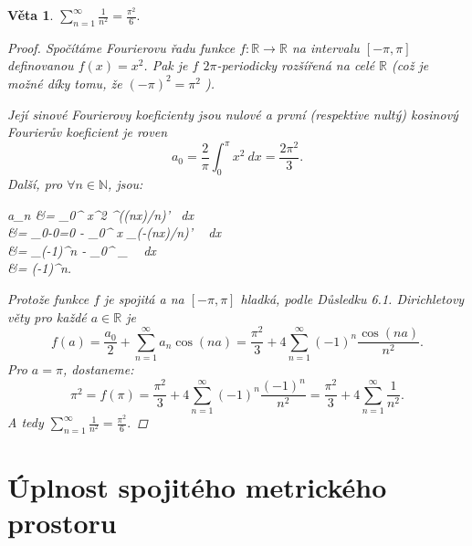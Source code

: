 \documentclass[10pt,a4paper]{article}
\newcommand{\R}{{\mathbb{R}}}       %
\newcommand{\N}{{\mathbb{N}}}       %
\newtheorem*{thm}{Věta}
\begin{document}
\begin{thm} $\displaystyle \sum_{n=1}^{\infty} \frac{1}{n^2} = \frac{\pi^2}{6}.$
	\begin{proof}
		Spočítáme Fourierovu řadu funkce $f : \R\to \R$ na intervalu $[-\pi, \pi]$ definovanou $f (x) = x^2$.
		Pak je $f$ $2\pi$-periodicky rozšířená na celé $\R$ \textit{(což je možné díky tomu, že $(-\pi)^2 = \pi^2$ )}. 
		
		Její sinové Fourierovy koeficienty jsou nulové a první (respektive nultý) kosinový Fourierův koeficient je roven 
		\[
			a_0 = \frac 2{\pi} \int_{0}^{\pi} x^2 ~dx = \frac{2\pi^2}{3}.
		\]
		Další, pro $\forall n \in \N$, jsou:
		\begin{flalign*}
			a_n &=  \int_{0}^{\pi} x^2 ^{(\sin (nx)/n)'} ~dx \\
			&=  _{0-0=0} -  \int_{0}^{\pi} x _{(-\cos (nx)/n)'} ~ dx\\
			&=  _{\pi(-1)^n} -  \int_{0}^{\pi} _{\sin {}} ~ dx\\
			&= (-1)^{n}.
		\end{flalign*}
		Protože funkce $ f $ je spojitá a na $[-\pi, \pi]$ hladká, podle \textit{Důsledku 6.1.} Dirichletovy věty pro každé $a \in \R$ je
		\[
			f(a) = \frac{a_0}{2} + \sum_{n=1}^{\infty} a_n \cos(na) = \frac{\pi^2}{3} + 4 \sum_{n=1}^{\infty} (-1)^n \frac{\cos(na)}{n^2}.
		\]
		Pro $a = \pi$, dostaneme:
		\[
			\pi^2 = f(\pi) =  \frac{\pi^2}{3} + 4 \sum_{n=1}^{\infty} (-1)^n \frac{(-1)^n}{n^2} = \frac{\pi^2}{3} + 4 \sum_{n=1}^{\infty} \frac{1}{n^2}.
		\]A tedy $\displaystyle \sum_{n=1}^{\infty} \frac{1}{n^2} = \frac{\pi^2}{6}.$
	\end{proof}
\end{thm}

\section{Úplnost spojitého metrického prostoru}
\end{document}
